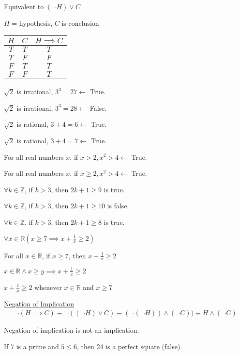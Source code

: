 \documentclass{article}
\begin{document}
Equivalent to $(\neg H) \vee C$

$H$ = hypothesis, $C$ is conclusion

\begin{table}[!h]
    \centering
    \begin{tabular}{|c|c|c|} \hline 
        $H$ & $C$ & $H \implies C$\\ \hline 
        $T$ & $T$ & $T$\\ \hline 
        $T$ & $F$ & $F$\\ \hline 
        $F$ & $T$ & $T$\\ \hline 
        $F$ & $F$ & $T$\\ \hline
    \end{tabular}
\end{table}

$\sqrt{2}$ is irrational, $3^3 = 27 \leftarrow$ True.

$\sqrt{2}$ is irrational, $3^3 = 28 \leftarrow$ False.

$\sqrt{2}$ is rational, $3+4=6 \leftarrow$ True.

$\sqrt{2}$ is rational, $3+4=7 \leftarrow$ True.

For all real numbers $x$, if $x > 2, x^2 > 4 \leftarrow$ True.

For all real numbers $x$, if $x \ge 2, x^2 > 4 \leftarrow$ True.

$\forall k \in \mathbb{Z}$, if $k > 3$, then $2k+1 \ge 9$ is true.

$\forall k \in \mathbb{Z}$, if $k > 3$, then $2k+1 \ge 10$ is false.

$\forall k \in \mathbb{Z}$, if $k > 3$, then $2k + 1 \ge 8$ is true.

$\forall x \in \mathbb{R} (x \ge 7 \implies x + \frac{1}{x} \ge 2)$

For all $x \in \mathbb{R}$, if $x \ge 7$, then $x + \frac{1}{x} \ge 2$

$x \in \mathbb{R} \wedge x \ge y \implies x + \frac{1}{x} \ge 2$

$x + \frac{1}{x} \ge 2$ whenever $x \in \mathbb{R}$ and $x \ge 7$


\underline{Negation of Implication}
\begin{align*}
    \neg (H \implies C) \equiv \neg((\neg H) \vee C) \equiv (\neg(\neg H)) \wedge (\neg C)) \equiv H \wedge (\neg C)
\end{align*}

Negation of implication is not an implication. 

If 7 is a prime and $5 \le 6$, then 24 is a perfect square (false). 
\end{document}

